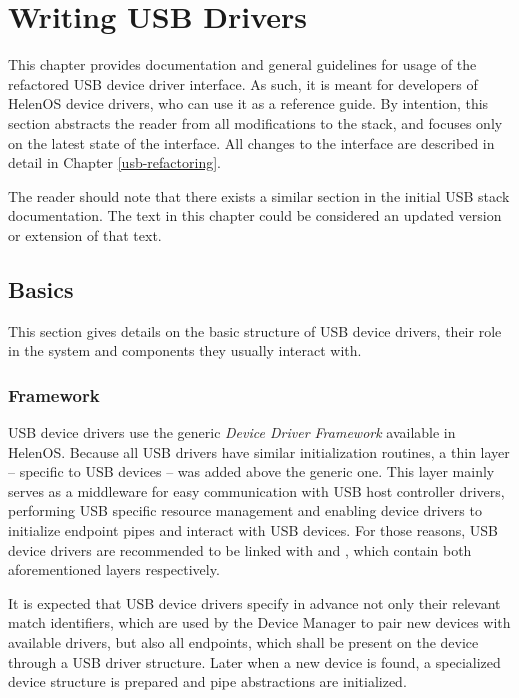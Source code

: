 \chapter{Writing USB Drivers}
\label{chap:usb-drivers}

This chapter provides documentation and general guidelines for usage of the
refactored USB device driver interface. As such, it is meant for developers of
HelenOS device drivers, who can use it as a reference guide. By intention, this
section abstracts the reader from all modifications to the stack, and focuses
only on the latest state of the interface. All changes to the interface are
described in detail in Chapter \ref{usb-refactoring}.

The reader should note that there exists a similar section in the initial USB
stack documentation. The text in this chapter could be considered an updated
version or extension of that text.


\section{Basics}

This section gives details on the basic structure of USB device drivers, their
role in the system and components they usually interact with.


\subsection{Framework}

USB device drivers use the generic \textit{Device Driver Framework} available in
HelenOS. Because all USB drivers have similar initialization routines, a thin
layer -- specific to USB devices -- was added above the generic one. This layer
mainly serves as a middleware for easy communication with USB host controller
drivers, performing USB specific resource management and enabling device drivers
to initialize endpoint pipes and interact with USB devices. For those reasons,
USB device drivers are recommended to be linked with  and
, which contain both aforementioned layers respectively.

It is expected that USB device drivers specify in advance not only their
relevant match identifiers, which are used by the Device Manager to pair new
devices with available drivers, but also all endpoints, which shall be present
on the device through a USB driver structure. Later when a new device is found,
a specialized device structure is prepared and pipe abstractions are
initialized.

